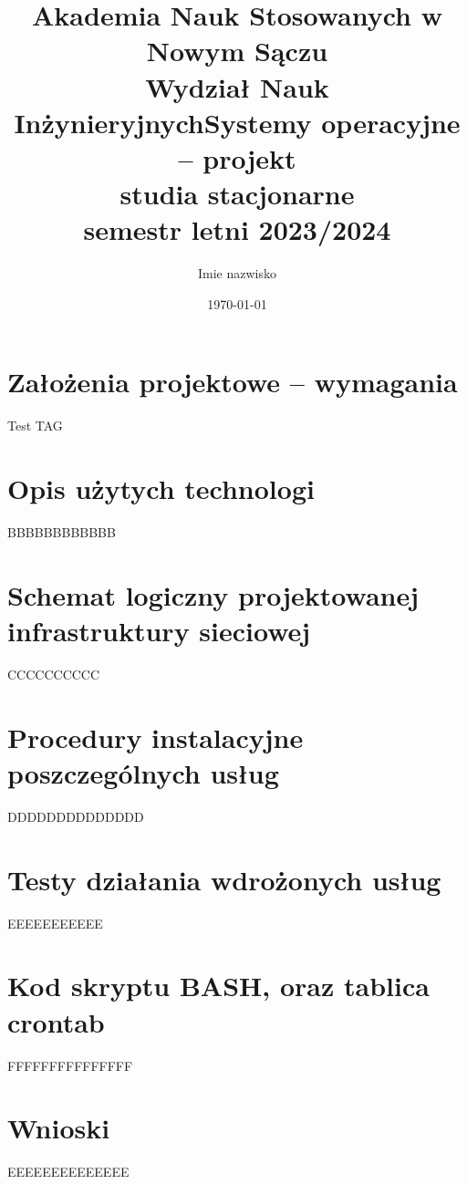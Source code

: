\documentclass[a4paper]{article}
\title{\textbf{Akademia Nauk Stosowanych w Nowym Sączu\\Wydział Nauk Inżynieryjnych\newline \newline Systemy operacyjne – projekt\\studia stacjonarne\\semestr letni 2023/2024}}
\author{Imie nazwisko}
\date{\today}
\begin{document}
\maketitle
\newpage
\tableofcontents
\newpage

\section{Założenia projektowe – wymagania}
Test TAG 
\section{Opis użytych technologi}
BBBBBBBBBBBB
\section{Schemat logiczny projektowanej infrastruktury sieciowej}
CCCCCCCCCC
\section{Procedury instalacyjne poszczególnych usług}
DDDDDDDDDDDDDD
\section{Testy działania wdrożonych usług}
EEEEEEEEEEE
\section{Kod skryptu BASH, oraz tablica crontab}
FFFFFFFFFFFFFFF
\section{Wnioski}
EEEEEEEEEEEEEE
\newpage
\nocite{k8s-docs}
\nocite{k8s-blog}
\nocite{k8s-github}
\printbibliography[heading=bibnumbered, label=Literatura, title=Literatura]
\end{document}
